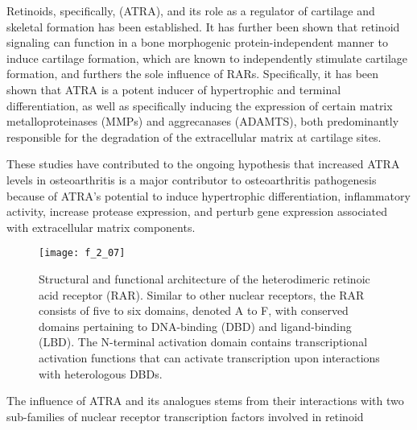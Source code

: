 \begin{refsection}
Retinoids, specifically,  (ATRA), and its role
as a regulator of cartilage and skeletal formation has been
established.\cite{Koyama1999} It has further been shown that retinoid signaling
can function in a bone morphogenic protein-independent manner to induce cartilage formation, which
are known to independently stimulate cartilage formation, and furthers the sole
influence of RARs.\cite{Weston2000} Specifically, it has been shown that ATRA is
a potent inducer of hypertrophic and terminal differentiation, as well as
specifically inducing the expression of certain matrix metalloproteinases (MMPs)
and aggrecanases (ADAMTS), both predominantly responsible for the degradation of
the extracellular matrix at cartilage
sites.\cite{Wang2002,Iwamoto1994,Koyama1999,Johnson2003}

These studies have contributed to the ongoing hypothesis that increased ATRA
levels in osteoarthritis is a major contributor to osteoarthritis pathogenesis
because of ATRA's potential to induce hypertrophic differentiation, inflammatory
activity, increase protease expression, and perturb gene expression associated
with extracellular matrix components. 
\begin{figure}[h!] \centering \texttt{[image: f\_2\_07]}
    \caption[Structural and functional architecture of the heterodimeric
        retinoic acid receptor (RAR). Similar to other nuclear receptors, the
        RAR consists of five to six domains, denoated A to F, with conserved
        domains pertaining to DNA-binding (DBD) and ligand-binding (LBD).  The
        N-terminal activation domain contains transcriptional activation
        functions that can activate transcription upon interactions with
        heterologous DBDs.]
        {Structural and functional architecture of the heterodimeric
        retinoic acid receptor (RAR). Similar to other nuclear receptors, the
        RAR consists of five to six domains, denoted A to F, with conserved
        domains pertaining to DNA-binding (DBD) and ligand-binding (LBD).  The
        N-terminal activation domain contains transcriptional activation
        functions that can activate transcription upon interactions with
        heterologous
        DBDs.\cite{DeLera2007}}\label{fig:retinoid_receptor_structures}
    \end{figure}
The influence of ATRA and its analogues stems from their interactions with two
sub-families of nuclear receptor transcription factors involved in retinoid

\end{refsection}
